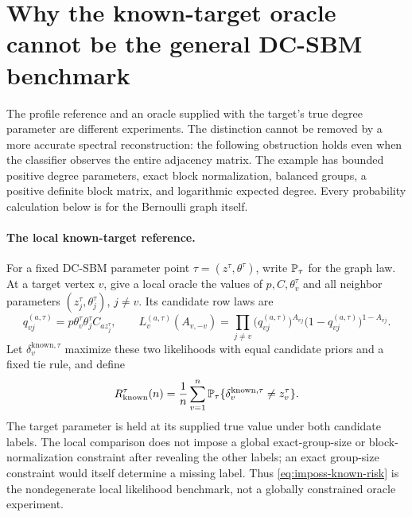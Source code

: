 \section{Why the known-target oracle cannot be the general DC-SBM benchmark}
\label{sec:impossibility}

The profile reference and an oracle supplied with the target's true degree
parameter are different experiments. The distinction cannot be removed by
a more accurate spectral reconstruction: the following obstruction holds
even when the classifier observes the entire adjacency matrix. The example
has bounded positive degree parameters, exact block normalization, balanced
groups, a positive definite block matrix, and logarithmic expected degree.
Every probability calculation below is for the Bernoulli graph itself.

\paragraph{The local known-target reference.}
For a fixed DC-SBM parameter point \(\tau=(z^\tau,\theta^\tau)\), write
\(\mathbb P_\tau\) for the graph law. At a target vertex \(v\), give a local oracle
the values of \(p,C,\theta_v^\tau\) and all neighbor parameters
\((z_j^\tau,\theta_j^\tau)\), \(j\ne v\). Its candidate row laws are
\begin{equation}
 q_{vj}^{(a,\tau)}
   =p\theta_v^\tau\theta_j^\tau C_{a z_j^\tau},\qquad
 L_v^{(a,\tau)}(A_{v,-v})
   =\prod_{j\ne v}
     \bigl(q_{vj}^{(a,\tau)}\bigr)^{A_{vj}}
     \bigl(1-q_{vj}^{(a,\tau)}\bigr)^{1-A_{vj}}.
 \label{eq:imposs-local-laws}
\end{equation}
Let \(\delta_v^{\mathrm{known},\tau}\) maximize these two likelihoods with
equal candidate priors and a fixed tie rule, and define
\begin{equation}
 R_{\mathrm{known}}^\tau(n)
   =\frac1n\sum_{v=1}^n
     \mathbb P_\tau\{\delta_v^{\mathrm{known},\tau}\ne z_v^\tau\}.
 \label{eq:imposs-known-risk}
\end{equation}
The target parameter is held at its supplied true value under both candidate
labels. The local comparison does not impose a global exact-group-size or
block-normalization constraint after revealing the other labels; an exact
group-size constraint would itself determine a missing label. Thus
\eqref{eq:imposs-known-risk} is the nondegenerate local likelihood benchmark,
not a globally constrained oracle experiment.

